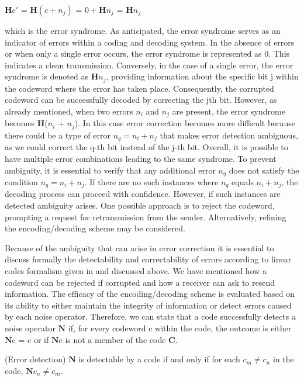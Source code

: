 \documentclass{Configuration_Files/PoliMi3i_thesis}
\begin{document}
\begin{center}
	$\textbf{H}c'$ = $\textbf{H} ( c + n_j )$ = $0 + \textbf{H} n_j $  = $\textbf{H}n_j $ 
\end{center}

which is the error syndrome. As anticipated, the error syndrome serves as an indicator of errors within a coding and decoding system. In the absence of errors or when only a single error occurs, the error syndrome is represented as 0. This indicates a clean transmission. Conversely, in the case of a single error, the error syndrome is denoted as {\bf H}$n_j$, providing information about the specific bit j within the codeword where the error has taken place. Consequently, the corrupted codeword can be successfully decoded by correcting the jth bit. However, as already mentioned, when two errors $n_i$ and $n_j$ are present, the error syndrome becomes {\bf H}($n_i$ + $n_j$). In this case error correction becomes more difficult because there could be a type of error $n_q = n_i + n_j$ that makes error detection ambiguous, as we could correct the q-th bit instead of the j-th bit. Overall, it is possible to have multiple error combinations leading to the same syndrome. To prevent ambiguity, it is essential to verify that any additional error $n_q$ does not satisfy the condition $n_q = n_i + n_j$. If there are no such instances where $n_q$ equals $ n_i + n_j$, the decoding process can proceed with confidence. However, if such instances are detected ambiguity arises. One possible approach is to reject the codeword, prompting a request for retransmission from the sender. Alternatively, refining the encoding/decoding scheme may be considered. \newline

Because of the ambiguity that can arise in error correction it is essential to discuss formally the detectability and correctability of errors according to linear codes formalism given in \cite{Cha06} and discussed above.
We have mentioned how a codeword can be rejected if corrupted and how a receiver can ask to resend information. The efficacy of the encoding/decoding scheme is evaluated based on its ability to either maintain the integrity of information or detect errors caused by each noise operator. Therefore, we can state that a code successfully detects a noise operator $\textbf{N}$ if, for every codeword c within the code, the outcome is either $\textbf{N}$c = c or if $\textbf{N}$c is not a member of the code $\textbf{C}$.

\begin{theorem}(Error detection)
	$\textbf{N}$ is detectable by a code if and only if for each $c_m \neq c_n$ in the code, $\textbf{N}c_n \neq c_m $.
\end{theorem} 
\end{document}
